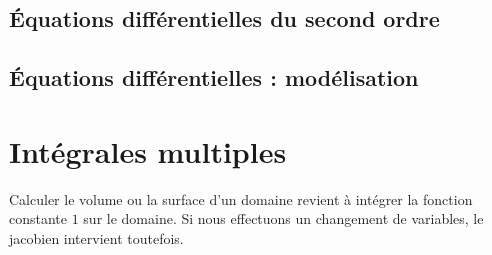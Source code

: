 					\subsection{Équations différentielles du second ordre}


					\subsection{Équations différentielles : modélisation}





					\section{Intégrales multiples}

%
%


Calculer le volume ou la surface d'un domaine revient à intégrer la fonction constante $1$ sur le domaine. Si nous effectuons un changement de variables, le jacobien intervient toutefois.




